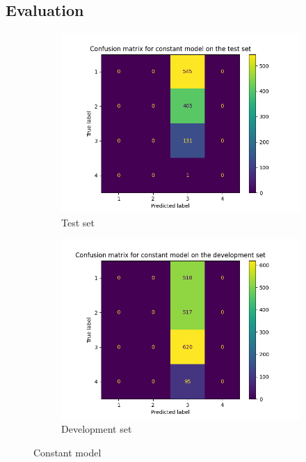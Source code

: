\documentclass{article}
\begin{document}
\begin{appendices}
	\section{Evaluation}
	\begin{figure}[h]
		\centering
		\begin{subfigure}[t]{0.49\textwidth}
			\centering
			\includegraphics[width=\textwidth]{sais_confusion_matrix_constant_test.png}
			\caption{Test set}
		\end{subfigure}
		\hfil
		\begin{subfigure}[t]{0.49\textwidth}
			\centering
			\includegraphics[width=\textwidth]{sais_confusion_matrix_constant_development.png}
			\caption{Development set}
		\end{subfigure}
		\caption{Constant model}
	\end{figure}


\end{appendices}
\end{document}

